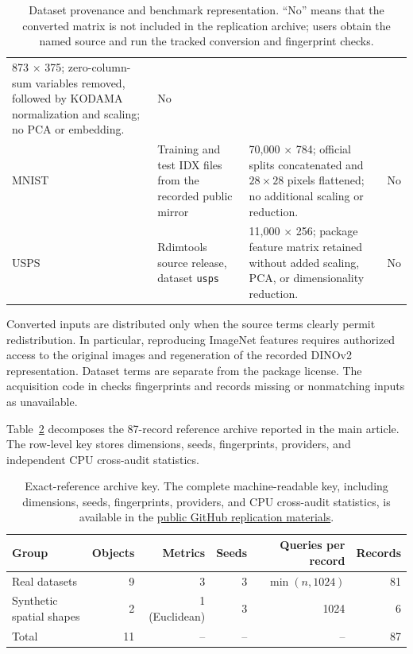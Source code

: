 \documentclass[11pt]{article}
\newcommand{\code}[1]{\texttt{#1}}
\newcommand{\pkg}[1]{\textsf{#1}}
\begin{document}
\begin{table}[H]
\begin{tabularx}{\textwidth}{@{}p{}p{}X p{}@{}}
873 $\times$ 375; zero-column-sum variables removed, followed by KODAMA normalization and scaling; no PCA or embedding. & No \\
MNIST & Training and test IDX files from the recorded public mirror \citep{LeCun1998} &
70,000 $\times$ 784; official splits concatenated and $28\times28$ pixels flattened; no additional scaling or reduction. & No \\
USPS & \pkg{Rdimtools} source release, dataset \code{usps}
\citep{YouShung2022,Hull1994} &
11,000 $\times$ 256; package feature matrix retained without added scaling, PCA, or dimensionality reduction. & No \\
\bottomrule
\end{tabularx}
\caption{Dataset provenance and benchmark representation. ``No'' means that
the converted matrix is not included in the replication archive; users obtain
the named source and run the tracked conversion and fingerprint checks.}
\label{tab:dataset-provenance}
\end{table}

Converted inputs are distributed only when the source terms clearly permit
redistribution. In particular, reproducing ImageNet features requires
authorized access to the original images and regeneration of the recorded
DINOv2 representation. Dataset terms are separate from the package license.
The acquisition code in  checks
fingerprints and records missing or nonmatching inputs as unavailable.

Table~\ref{tab:reference-key} decomposes the 87-record reference archive
reported in the main article. The row-level key stores dimensions, seeds,
fingerprints, providers, and independent CPU cross-audit statistics.

\begin{table}[h]
\centering

\begin{tabular}{@{}lrrrrr@{}}
\toprule
Group & Objects & Metrics & Seeds & Queries per record & Records \\
\midrule
Real datasets & 9 & 3 & 3 & $\min(n,1024)$ & 81 \\
Synthetic spatial shapes & 2 & 1 (Euclidean) & 3 & 1024 & 6 \\
\midrule
Total & 11 & -- & -- & -- & 87 \\
\bottomrule
\end{tabular}
\caption{Exact-reference archive key. The complete machine-readable key,
including dimensions, seeds, fingerprints, providers, and CPU cross-audit
statistics, is available in the
\href{https://github.com/tkcaccia/faissR/tree/main/manuscript/jss}{public
GitHub replication materials}.}
\label{tab:reference-key}
\end{table}
\end{document}
